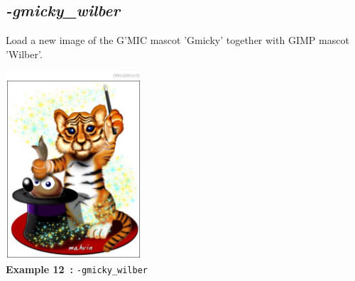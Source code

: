 \documentclass[a4paper,11pt,twoside]{book}
\begin{document}
\subsection{\emph{-gmicky\_wilber} }\vspace*{-0.5em}
Load a new image of the G'MIC mascot 'Gmicky' together with GIMP mascot 'Wilber'.
\begin{center}\includegraphics[keepaspectratio=true,height=7cm,width=\textwidth]{img/gmic_def12.jpg}\\
{\footnotesize \textbf{Example 12~:} \texttt{-gmicky\_wilber}}
\end{center}
\end{document}
